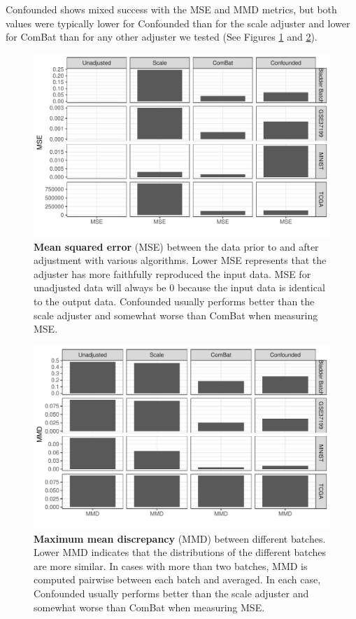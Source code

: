 \documentclass[notitlepage]{article}
\begin{document}
Confounded shows mixed success with the MSE and MMD metrics, but both values were typically lower for Confounded than for the scale adjuster and lower for ComBat than for any other adjuster we tested (See Figures \ref{fig:mse} and \ref{fig:mmd}).

\begin{figure}
	\centering
	\includegraphics[width=\columnwidth]{figures/final/mse.pdf}
	\caption{\textbf{Mean squared error} (MSE) between the data prior to and after adjustment with various algorithms.
	Lower MSE represents that the adjuster has more faithfully reproduced the input data.
	MSE for unadjusted data will always be 0 because the input data is identical to the output data.
	Confounded usually performs better than the scale adjuster and somewhat worse than ComBat when measuring MSE.}
	\label{fig:mse}
\end{figure}
\begin{figure}
	\centering
	\includegraphics[width=\columnwidth]{figures/final/mmd.pdf}
	\caption{\textbf{Maximum mean discrepancy} (MMD) between different batches. Lower MMD indicates that the distributions of the different batches are more similar.
	In cases with more than two batches, MMD is computed pairwise between each batch and averaged.
	In each case, Confounded usually performs better than the scale adjuster and somewhat worse than ComBat when measuring MSE.}
	\label{fig:mmd}
\end{figure}
\end{document}
